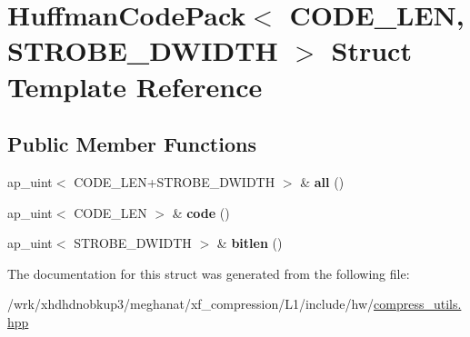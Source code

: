 \hypertarget{structHuffmanCodePack}{\section{Huffman\-Code\-Pack$<$ C\-O\-D\-E\-\_\-\-L\-E\-N, S\-T\-R\-O\-B\-E\-\_\-\-D\-W\-I\-D\-T\-H $>$ Struct Template Reference}
\label{structHuffmanCodePack}
}
\subsection*{Public Member Functions}
\begin{DoxyCompactItemize}
\item 
\hypertarget{structHuffmanCodePack_aa2295f73eeb2ba7c0957cd4f21fa68c0}{ap\-\_\-uint$<$ C\-O\-D\-E\-\_\-\-L\-E\-N+S\-T\-R\-O\-B\-E\-\_\-\-D\-W\-I\-D\-T\-H $>$ \& {\bfseries all} ()}\label{structHuffmanCodePack_aa2295f73eeb2ba7c0957cd4f21fa68c0}

\item 
\hypertarget{structHuffmanCodePack_a75ff7e7e6dc3752a71136ea8f43943f3}{ap\-\_\-uint$<$ C\-O\-D\-E\-\_\-\-L\-E\-N $>$ \& {\bfseries code} ()}\label{structHuffmanCodePack_a75ff7e7e6dc3752a71136ea8f43943f3}

\item 
\hypertarget{structHuffmanCodePack_ad868e7d2bc683d315ddddbf05610c06c}{ap\-\_\-uint$<$ S\-T\-R\-O\-B\-E\-\_\-\-D\-W\-I\-D\-T\-H $>$ \& {\bfseries bitlen} ()}\label{structHuffmanCodePack_ad868e7d2bc683d315ddddbf05610c06c}

\end{DoxyCompactItemize}


The documentation for this struct was generated from the following file\-:\begin{DoxyCompactItemize}
\item 
/wrk/xhdhdnobkup3/meghanat/xf\-\_\-compression/\-L1/include/hw/\hyperlink{compress__utils_8hpp}{compress\-\_\-utils.\-hpp}\end{DoxyCompactItemize}
